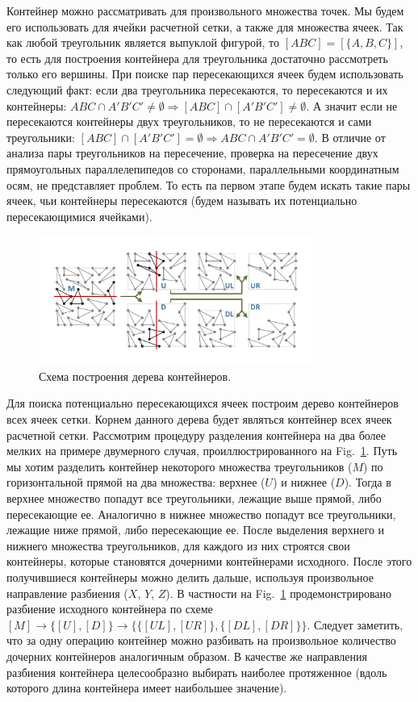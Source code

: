 \documentclass[
11pt,%
tightenlines,%
twoside,%
onecolumn,%
nofloats,%
nobibnotes,%
nofootinbib,%
superscriptaddress,%
noshowpacs,%
centertags]%
{revtex4}
\begin{document}
Контейнер можно рассматривать для произвольного множества точек.
Мы будем его использовать для ячейки расчетной сетки, а также для множества ячеек.
Так как любой треугольник является выпуклой фигурой, то $[ABC] = [\{A, B, C\}]$, то есть для построения контейнера для треугольника достаточно рассмотреть только его вершины.
При поиске пар пересекающихся ячеек будем использовать следующий факт: если два треугольника пересекаются, то пересекаются и их контейнеры: $ABC \cap A'B'C' \ne \emptyset \Rightarrow [ABC] \cap [A'B'C'] \ne \emptyset$.
А значит если не пересекаются контейнеры двух треугольников, то не пересекаются и сами треугольники: $[ABC] \cap [A'B'C'] = \emptyset \Rightarrow ABC \cap A'B'C' = \emptyset$.
В отличие от анализа пары треугольников на пересечение, проверка на пересечение двух прямоугольных параллелепипедов со сторонами, параллельными координатным осям, не представляет проблем.
То есть па первом этапе будем искать такие пары ячеек, чьи контейнеры пересекаются (будем называть их потенциально пересекающимися ячейками).

\begin{figure}[h]
\includegraphics[width=0.8\textwidth]{pics/pic_box_size.pdf}
\caption{Схема построения дерева контейнеров.}\label{fig:pic_box}
\end{figure}

Для поиска потенциально пересекающихся ячеек построим дерево контейнеров всех ячеек сетки.
Корнем данного дерева будет являться контейнер всех ячеек расчетной сетки.
Рассмотрим процедуру разделения контейнера на два более мелких на примере двумерного случая, проиллюстрированного на Fig.~\ref{fig:pic_box}.
Путь мы хотим разделить контейнер некоторого множества треугольников ($M$) по горизонтальной прямой на два множества: верхнее ($U$) и нижнее ($D$).
Тогда в верхнее множество попадут все треугольники, лежащие выше прямой, либо пересекающие ее.
Аналогично в нижнее множество попадут все треугольники, лежащие ниже прямой, либо пересекающие ее.
После выделения верхнего и нижнего множества треугольников, для каждого из них строятся свои контейнеры, которые становятся дочерними контейнерами исходного.
После этого получившиеся контейнеры можно делить дальше, используя произвольное направление разбиения ($X$, $Y$, $Z$).
В частности на Fig.~\ref{fig:pic_box} продемонстрировано разбиение исходного контейнера по схеме $[M] \rightarrow \{[U], [D]\} \rightarrow \{\{[UL], [UR]\}, \{[DL], [DR]\}\}$.
Следует заметить, что за одну операцию контейнер можно разбивать на произвольное количество дочерних контейнеров аналогичным образом.
В качестве же направления разбиения контейнера целесообразно выбирать наиболее протяженное (вдоль которого длина контейнера имеет наибольшее значение).
\end{document}
